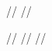 
//\renewcommand{\contentsname}{Table of Contents}
//\usepackage{etoolbox}
//\makeatletter
//
//\makeatother
